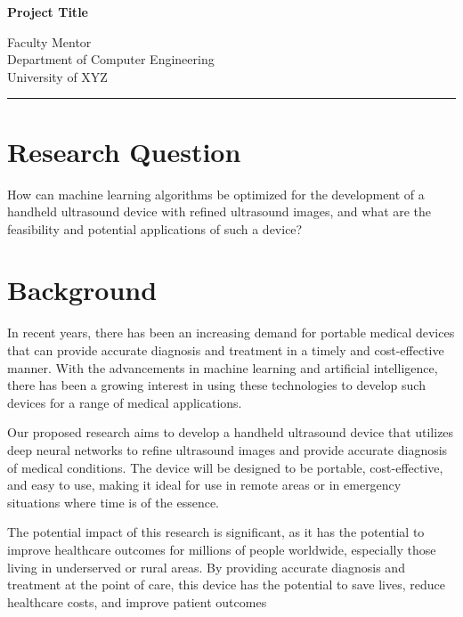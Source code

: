 \documentclass[12pt]{article}
\begin{document}
\begin{center}
\textbf{\LARGE Project Title}
\end{center}

\begin{flushright}
Faculty Mentor \\
Department of Computer Engineering \\
University of XYZ
\end{flushright}

\noindent\rule{\textwidth}{0.4pt}

\section{Research Question}
How can machine learning algorithms be optimized for the development of a handheld ultrasound device with refined ultrasound images, and what are the feasibility and potential applications of such a device?

\section{Background}
In recent years, there has been an increasing demand for portable medical devices that can provide accurate diagnosis and treatment in a timely and cost-effective manner. With the advancements in machine learning and artificial intelligence, there has been a growing interest in using these technologies to develop such devices for a range of medical applications.

Our proposed research aims to develop a handheld ultrasound device that utilizes deep neural networks to refine ultrasound images and provide accurate diagnosis of medical conditions. The device will be designed to be portable, cost-effective, and easy to use, making it ideal for use in remote areas or in emergency situations where time is of the essence.

The potential impact of this research is significant, as it has the potential to improve healthcare outcomes for millions of people worldwide, especially those living in underserved or rural areas. By providing accurate diagnosis and treatment at the point of care, this device has the potential to save lives, reduce healthcare costs, and improve patient outcomes


\end{document}

